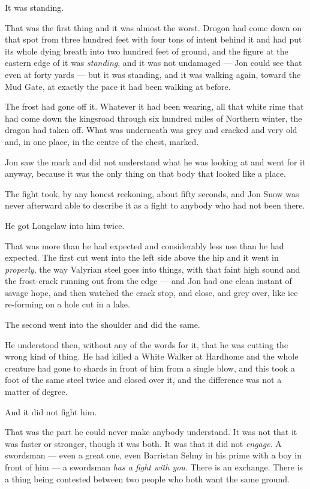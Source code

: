 It was standing.

That was the first thing and it was almost the worst. Drogon had come down on that spot from three hundred feet with four tons of intent behind it and had put its whole dying breath into two hundred feet of ground, and the figure at the eastern edge of it was \textit{standing}, and it was not undamaged — Jon could see that even at forty yards — but it was standing, and it was walking again, toward the Mud Gate, at exactly the pace it had been walking at before.

The frost had gone off it. Whatever it had been wearing, all that white rime that had come down the kingsroad through six hundred miles of Northern winter, the dragon had taken off. What was underneath was grey and cracked and very old and, in one place, in the centre of the chest, marked.

Jon saw the mark and did not understand what he was looking at and went for it anyway, because it was the only thing on that body that looked like a place.

\sceneBreak

The fight took, by any honest reckoning, about fifty seconds, and Jon Snow was never afterward able to describe it as a fight to anybody who had not been there.

He got Longclaw into him twice.

That was more than he had expected and considerably less use than he had expected. The first cut went into the left side above the hip and it went in \textit{properly}, the way Valyrian steel goes into things, with that faint high sound and the frost-crack running out from the edge — and Jon had one clean instant of savage hope, and then watched the crack stop, and close, and grey over, like ice re-forming on a hole cut in a lake.

The second went into the shoulder and did the same.

He understood then, without any of the words for it, that he was cutting the wrong kind of thing. He had killed a White Walker at Hardhome and the whole creature had gone to shards in front of him from a single blow, and this took a foot of the same steel twice and closed over it, and the difference was not a matter of degree.

And it did not fight him.

That was the part he could never make anybody understand. It was not that it was faster or stronger, though it was both. It was that it did not \textit{engage}. A swordsman — even a great one, even Barristan Selmy in his prime with a boy in front of him — a swordsman \textit{has a fight with you}. There is an exchange. There is a thing being contested between two people who both want the same ground.

